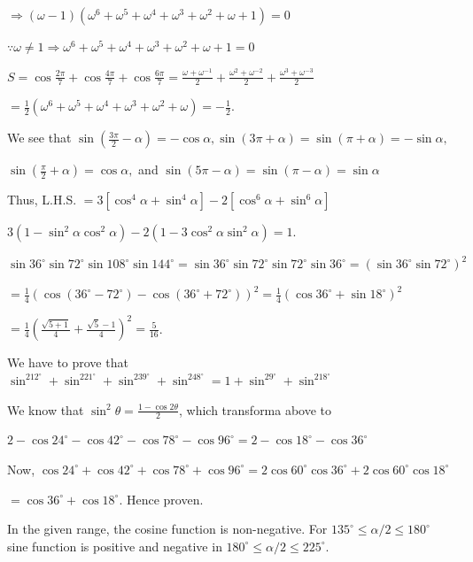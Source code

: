   $\Rightarrow (\omega - 1)\left(\omega^6 + \omega^5 + \omega^4 + \omega^3 + \omega^2 + \omega + 1\right) =
  0$

  $\because \omega\neq 1 \Rightarrow \omega^6 + \omega^5 + \omega^4 + \omega^3 + \omega^2 + \omega + 1 = 0$

  $S = \cos\frac{2\pi}{7} + \cos\frac{4\pi}{7} + \cos\frac{6\pi}{7} = \frac{\omega + \omega^{-1}}{2}
  + \frac{\omega^2 + \omega^{-2}}{2} + \frac{\omega^3 + \omega^{-3}}{2}$

  $= \frac{1}{2}\left(\omega^6 + \omega^5 + \omega^4 + \omega^3 + \omega^2 + \omega\right) = -\frac{1}{2}$.
\item We see that $\sin\left(\frac{3\pi}{2} - \alpha\right) = -\cos\alpha, \sin(3\pi + \alpha) = \sin(\pi
  + \alpha) = -\sin\alpha,$

  $\sin\left(\frac{\pi}{2} + \alpha\right) = \cos\alpha,$ and $\sin(5\pi - \alpha) = \sin(\pi - \alpha)
  = \sin\alpha$

  Thus, L.H.S. $= 3\left[\cos^4\alpha + \sin^4\alpha\right] - 2\left[\cos^6\alpha + \sin^6\alpha\right]$

  $ 3\left(1 - \sin^2\alpha\cos^2\alpha\right) - 2\left(1 - 3\cos^2\alpha\sin^2\alpha\right) = 1$.
\item $\sin36^\circ\sin72^\circ\sin108^\circ\sin144^\circ = \sin36^\circ\sin72^\circ\sin72^\circ\sin36^\circ
  = \left(\sin36^\circ\sin72^\circ\right)^2$

  $= \frac{1}{4}\left(\cos(36^\circ - 72^\circ) - \cos(36^\circ + 72^\circ)\right)^2
  = \frac{1}{4}\left(\cos36^\circ + \sin18^\circ\right)^2$

  $= \frac{1}{4}\left(\frac{\sqrt{5 + 1}}{4} + \frac{\sqrt{5} - 1}{4}\right)^2 = \frac{5}{16}$.
\item We have to prove that $\sin^212^\circ + \sin^221^\circ + \sin^239^\circ + \sin^248^\circ = 1
  + \sin^29^\circ + \sin^218^\circ$

  We know that $\sin^2\theta = \frac{1 - \cos2\theta}{2}$, which transforma above to

  $2 - \cos24^\circ - \cos42^\circ - \cos78^\circ - \cos96^\circ = 2 - \cos18^\circ - \cos36^\circ$

  Now, $\cos24^\circ + \cos42^\circ + \cos78^\circ + \cos96^\circ = 2\cos60^\circ\cos36^\circ +
  2\cos60^\circ\cos18^\circ$

  $= \cos36^\circ + \cos18^\circ$. Hence proven.
\item In the given range, the cosine function is non-negative. For $135^\circ\leq \alpha/2\leq 180^\circ$
  sine function is positive and negative in $180^\circ\leq \alpha/2 \leq 225^\circ$.

